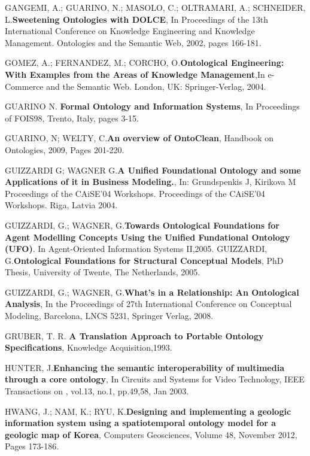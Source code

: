 \documentclass[ti]{iiufrgs}
\begin{document}
\begin{thebibliography}{este-parametro-nao-eh-usado-pelo-estilo-ABNT}
GANGEMI, A.; GUARINO, N.; MASOLO, C.; OLTRAMARI, A.; SCHNEIDER, L.\@ \textbf{Sweetening Ontologies with DOLCE}, In Proceedings of the 13th International Conference on Knowledge Engineering and Knowledge Management. Ontologies and the Semantic Web, 2002, pages 166-181.

GOMEZ, A.; FERNANDEZ, M.; CORCHO, O.\@ \textbf{Ontological Engineering: With Examples from the Areas of Knowledge Management},In e-Commerce and the Semantic Web. London, UK: Springer-Verlag, 2004.

GUARINO N. \@ \textbf{Formal Ontology and Information Systems}, In Proceedings of FOIS98, Trento, Italy, pages 3-15.

GUARINO, N; WELTY, C.\@ \textbf{An overview of OntoClean}, Handbook on Ontologies, 2009, Pages 201-220.

GUIZZARDI G; WAGNER G.\@ \textbf{A Unified Foundational Ontology and some Applications of it in Business Modeling.}, In: Grundspenkis J, Kirikova M Proceedings of the CAiSE'04 Workshops. Proceedings of the CAiSE'04 Workshops. Riga, Latvia 2004.

GUIZZARDI, G.; WAGNER, G.\@ \textbf{Towards Ontological Foundations for Agent Modelling Concepts Using the Unified Fundational Ontology (UFO)}. In Agent-Oriented Information Systems II,2005. 
GUIZZARDI, G.\@ \textbf{Ontological Foundations for Structural Conceptual Models}, PhD Thesis, University of Twente, The Netherlands, 2005.

GUIZZARDI, G.; WAGNER, G.\@ \textbf{What's in a Relationship: An Ontological Analysis}, In the Proceedings of 27th International Conference on Conceptual Modeling, Barcelona, LNCS 5231, Springer Verlag, 2008.

GRUBER, T. R. \@ \textbf{A Translation Approach to Portable Ontology Specifications}, Knowledge Acquisition,1993.

HUNTER, J.\@ \textbf{Enhancing the semantic interoperability of multimedia through a core 	ontology}, In Circuits and Systems for Video Technology, IEEE Transactions 	on , vol.13, no.1, pp.49,58, Jan 2003.

HWANG, J.; NAM, K.; RYU, K.\@ \textbf{Designing and implementing a geologic information system using a spatiotemporal ontology model for a geologic map of Korea}, Computers Geosciences, Volume 48, November 2012, Pages 173-186.


\end{thebibliography}
\end{document}
